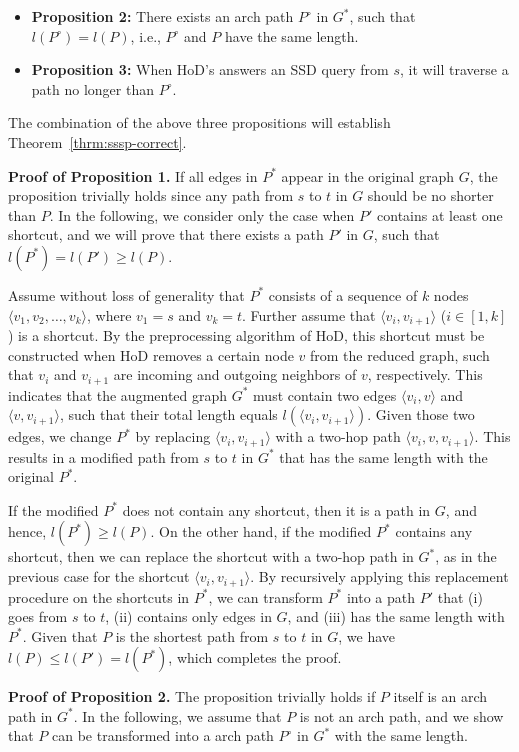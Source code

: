 \documentclass{sig-alternate}
\def\header{\vspace{2mm} \noindent}
\def\G{G^*}
\def\P{P^*}
\def\PA{P^\circ}
\begin{document}
\begin{sloppy}
\begin{itemize}
\item {\bf Proposition 2:} There exists an arch path $\PA$ in $\G$, such that $l(\PA) = l(P)$, i.e., $\PA$ and $P$ have the same length.

\item {\bf Proposition 3:} When HoD's answers an SSD query from $s$, it will traverse a path no longer than $\PA$.
\end{itemize}
The combination of the above three propositions will establish Theorem~\ref{thrm:sssp-correct}.

\header
{\bf Proof of Proposition 1.} If all edges in $\P$ appear in the original graph $G$, the proposition trivially holds since any path from $s$ to $t$ in $G$ should be no shorter than $P$. In the following, we consider only the case when $P'$ contains at least one shortcut, and we will prove that there exists a path $P'$ in $G$, such that $l(\P) = l(P') \ge l(P)$.

Assume without loss of generality that $\P$ consists of a sequence of $k$ nodes $\langle v_1, v_2, \ldots, v_k\rangle$, where $v_1 = s$ and $v_k = t$. Further assume that $\langle v_i, v_{i+1}\rangle$ ($i \in [1, k]$) is a shortcut. By the preprocessing algorithm of HoD, this shortcut must be constructed when HoD removes a certain node $v$ from the reduced graph, such that $v_i$ and $v_{i+1}$ are incoming and outgoing neighbors of $v$, respectively. This indicates that the augmented graph $\G$ must contain two edges $\langle v_i, v \rangle$ and $\langle v, v_{i+1} \rangle$, such that their total length equals $l(\langle v_i, v_{i+1}\rangle)$. Given those two edges, we change $\P$ by replacing $\langle v_i, v_{i+1}\rangle$ with a two-hop path $\langle v_i, v, v_{i+1}\rangle$. This results in a modified path from $s$ to $t$ in $\G$ that has the same length with the original $\P$.

If the modified $\P$ does not contain any shortcut, then it is a path in $G$, and hence, $l(\P) \ge l(P)$. On the other hand, if the modified $\P$ contains any shortcut, then we can replace the shortcut with a two-hop path in $\G$, as in the previous case for the shortcut $\langle v_i, v_{i+1}\rangle$. By recursively applying this replacement procedure on the shortcuts in $\P$, we can transform $\P$ into a path $P'$ that (i) goes from $s$ to $t$, (ii) contains only edges in $G$, and (iii) has the same length with $\P$. Given that $P$ is the shortest path from $s$ to $t$ in $G$, we have $l(P) \le l(P') = l(\P)$, which completes the proof.

\header
{\bf Proof of Proposition 2.} The proposition trivially holds if $P$ itself is an arch path in $\G$. In the following, we assume that $P$ is not an arch path, and we show that $P$ can be transformed into a arch path $\PA$ in $\G$ with the same length.


\end{sloppy}
\end{document}

